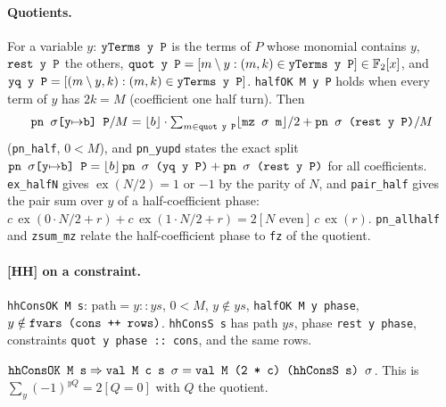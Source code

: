 \paragraph{Quotients.} For a variable $y$:
$\textnormal{\texttt{yTerms y P}}$ is the terms of $P$ whose monomial contains $y$, $\textnormal{\texttt{rest y P}}$ the others,
$\textnormal{\texttt{quot y P}} = [m\setminus y : (m,k)\in\textnormal{\texttt{yTerms y P}}]\in\mathbb F_2[x]$, and
$\textnormal{\texttt{yq y P}} = [(m\setminus y,k) : (m,k)\in\textnormal{\texttt{yTerms y P}}]$. \textnormal{\texttt{halfOK M y P}} holds when
every term of $y$ has $2k=M$ (coefficient one half turn). Then
\begin{equation}\label{eq:lean-pathsum-half}
\textnormal{\texttt{pn \ensuremath{\sigma}[y\ensuremath{\mapsto}b] P}}/M = \lfloor b\rfloor\cdot\textstyle\sum_{m\in\textnormal{\texttt{quot y P}}}\lfloor\textnormal{\texttt{mz \ensuremath{\sigma} m}}\rfloor/2 + \textnormal{\texttt{pn \ensuremath{\sigma} (\allowbreak{}rest y P)}}/M
\end{equation}
(\textnormal{\texttt{pn\_\allowbreak{}half}}, $0<M$), and \textnormal{\texttt{pn\_\allowbreak{}yupd}} states the exact split
$\textnormal{\texttt{pn \ensuremath{\sigma}[y\ensuremath{\mapsto}b] P}} = \lfloor b\rfloor\,\textnormal{\texttt{pn \ensuremath{\sigma} (\allowbreak{}yq y P)}} + \textnormal{\texttt{pn \ensuremath{\sigma} (\allowbreak{}rest y P)}}$ for all
coefficients. \textnormal{\texttt{ex\_\allowbreak{}halfN}} gives $\operatorname{ex}(N/2) = 1$ or $-1$ by the parity of $N$, and
\textnormal{\texttt{pair\_\allowbreak{}half}} gives the pair sum over $y$ of a half-coefficient phase:
$c\,\operatorname{ex}(0\cdot N/2+r)+c\,\operatorname{ex}(1\cdot N/2+r) = 2[N\text{ even}]\,c\,\operatorname{ex}(r)$.
\textnormal{\texttt{pn\_\allowbreak{}allhalf}} and \textnormal{\texttt{zsum\_\allowbreak{}mz}} relate the half-coefficient phase to \textnormal{\texttt{fz}} of the
quotient.

\paragraph{[HH] on a constraint.} \textnormal{\texttt{hhConsOK M s}}: $\text{path}=y::ys$, $0<M$, $y\notin ys$,
\textnormal{\texttt{halfOK M y phase}}, $y\notin\textnormal{\texttt{fvars (\allowbreak{}cons ++ rows)}}$.
\textnormal{\texttt{hhConsS s}} has path $ys$, phase \textnormal{\texttt{rest y phase}}, constraints
\textnormal{\texttt{quot y phase :: cons}}, and the same rows.
\begin{theorem}
$\textnormal{\texttt{hhConsOK M s}}\Rightarrow\textnormal{\texttt{val M c s \ensuremath{\sigma}}} = \textnormal{\texttt{val M (\allowbreak{}2 * c) (\allowbreak{}hhConsS s) \ensuremath{\sigma}}}$. This is
$\sum_{y}(-1)^{yQ} = 2[Q=0]$ with $Q$ the quotient.
\end{theorem}

